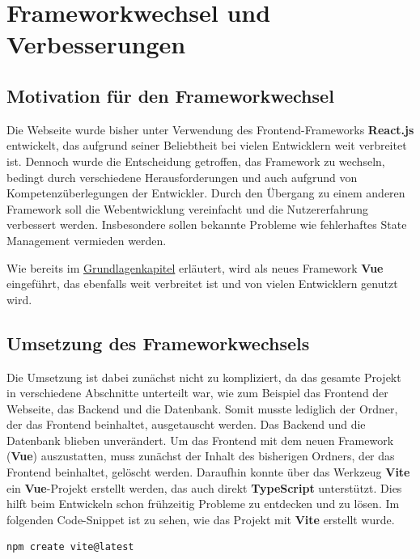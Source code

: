 \section{Frameworkwechsel und Verbesserungen}

\subsection{Motivation für den Frameworkwechsel}

Die Webseite wurde bisher unter Verwendung des Frontend-Frameworks \textbf{React.js} entwickelt, das aufgrund seiner Beliebtheit bei vielen Entwicklern weit verbreitet ist. Dennoch wurde die Entscheidung getroffen, das Framework zu wechseln, bedingt durch verschiedene Herausforderungen und auch aufgrund von Kompetenzüberlegungen der Entwickler. Durch den Übergang zu einem anderen Framework soll die Webentwicklung vereinfacht und die Nutzererfahrung verbessert werden. Insbesondere sollen bekannte Probleme wie fehlerhaftes State Management vermieden werden.

Wie bereits im \hyperref[chapter:3-frontend-frameworks]{Grundlagenkapitel} erläutert, wird als neues Framework \textbf{Vue} eingeführt, das ebenfalls weit verbreitet ist und von vielen Entwicklern genutzt wird.

\subsection{Umsetzung des Frameworkwechsels}

Die Umsetzung ist dabei zunächst nicht zu kompliziert, da das gesamte Projekt in verschiedene Abschnitte unterteilt war, wie zum Beispiel das Frontend der Webseite, das Backend und die Datenbank. Somit musste lediglich der Ordner, der das Frontend beinhaltet, ausgetauscht werden. Das Backend und die Datenbank blieben unverändert. Um das Frontend mit dem neuen Framework (\textbf{Vue}) auszustatten, muss zunächst der Inhalt des bisherigen Ordners, der das Frontend beinhaltet, gelöscht werden. Daraufhin konnte über das Werkzeug \textbf{Vite} ein \textbf{Vue}-Projekt erstellt werden, das auch direkt \textbf{TypeScript} unterstützt. Dies hilft beim Entwickeln schon frühzeitig Probleme zu entdecken und zu lösen. Im folgenden Code-Snippet ist zu sehen, wie das Projekt mit \textbf{Vite} erstellt wurde.

\begin{lstlisting}[language={bash}, caption={Initialisierung des Vue Projektes mit Vite \cite{vitejs-getting-started}}]
npm create vite@latest
\end{lstlisting}

